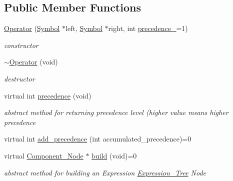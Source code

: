 \subsection*{Public Member Functions}
\begin{DoxyCompactItemize}
\item 
\hyperlink{classMadara_1_1Expression__Tree_1_1Operator_a8f7a53635f64b094de257a2cfa8902d8}{Operator} (\hyperlink{classMadara_1_1Expression__Tree_1_1Symbol}{Symbol} $\ast$left, \hyperlink{classMadara_1_1Expression__Tree_1_1Symbol}{Symbol} $\ast$right, int \hyperlink{classMadara_1_1Expression__Tree_1_1Symbol_a2de31139261eea47dccd48d377780803}{precedence\_\-}=1)
\begin{DoxyCompactList}\small\item\em constructor \item\end{DoxyCompactList}\item 
\hyperlink{classMadara_1_1Expression__Tree_1_1Operator_ab9f4268b8210fa64a394e661e419af25}{$\sim$Operator} (void)
\begin{DoxyCompactList}\small\item\em destructor \item\end{DoxyCompactList}\item 
virtual int \hyperlink{classMadara_1_1Expression__Tree_1_1Symbol_ac060dedb8d16864591b259df375109b3}{precedence} (void)
\begin{DoxyCompactList}\small\item\em abstract method for returning precedence level (higher value means higher precedence \item\end{DoxyCompactList}\item 
virtual int \hyperlink{classMadara_1_1Expression__Tree_1_1Symbol_ae16afabe3c5f9ba32d06386eb02e7e0c}{add\_\-precedence} (int accumulated\_\-precedence)=0
\item 
virtual \hyperlink{classMadara_1_1Expression__Tree_1_1Component__Node}{Component\_\-Node} $\ast$ \hyperlink{classMadara_1_1Expression__Tree_1_1Symbol_a01fdf1d8b06b3d6e49027d35b761cce4}{build} (void)=0
\begin{DoxyCompactList}\small\item\em abstract method for building an Expression \hyperlink{classMadara_1_1Expression__Tree_1_1Expression__Tree}{Expression\_\-Tree} Node \item\end{DoxyCompactList}\end{DoxyCompactItemize}
